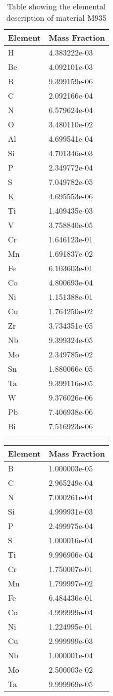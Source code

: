 \begin{centering}
\begin{longtable}[ht!]
{ p{} | p{} }
\hline
Element & Mass Fraction\\
\hline
H &  4.383222e-03\\
Be &  4.092101e-03\\
B &  9.399159e-06\\
C &  2.092166e-04\\
N &  6.579624e-04\\
O &  3.480110e-02\\
Al &  4.699541e-04\\
Si &  4.701346e-03\\
P &  2.349772e-04\\
S &  7.049782e-05\\
K &  4.695553e-06\\
Ti &  1.409435e-03\\
V &  3.758840e-05\\
Cr &  1.646123e-01\\
Mn &  1.691837e-02\\
Fe &  6.103603e-01\\
Co &  4.800693e-04\\
Ni &  1.151388e-01\\
Cu &  1.764250e-02\\
Zr &  3.734351e-05\\
Nb &  9.399324e-05\\
Mo &  2.349785e-02\\
Sn &  1.880066e-05\\
Ta &  9.399116e-05\\
W &  9.376026e-06\\
Pb &  7.406938e-06\\
Bi &  7.516923e-06\\
\caption{Table showing the elemental description of material M935}
\label{table:material_FirstWall}
\end{longtable}
\clearpage

\begin{longtable}[ht!]
{ p{} | p{} }
\hline
Element & Mass Fraction\\
\hline
B &  1.000003e-05\\
C &  2.965249e-04\\
N &  7.000261e-04\\
Si &  4.999931e-03\\
P &  2.499975e-04\\
S &  1.000016e-04\\
Ti &  9.996906e-04\\
Cr &  1.750007e-01\\
Mn &  1.799997e-02\\
Fe &  6.484436e-01\\
Co &  4.999999e-04\\
Ni &  1.224995e-01\\
Cu &  2.999999e-03\\
Nb &  1.000001e-04\\
Mo &  2.500003e-02\\
Ta &  9.999969e-05\\


\end{longtable}
\end{centering}
